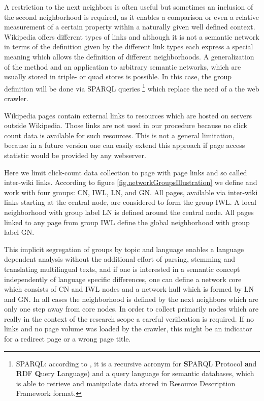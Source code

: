 \documentclass[a4paper,10pt]{scrbook}
\begin{document}
A restriction to the next neighbors is often useful but sometimes an inclusion of the second neighborhood is required, as it enables a comparison or even a relative measurement of a certain property within a naturally given well defined context. Wikipedia offers different types of links and although it is not a semantic network in terms of the definition given by \cite{SOWA1987} the different link types each express a special meaning which allows the definition of different neighborhoods. A generalization of the method and an application to arbitrary semantic networks, which are usually stored in triple- or quad stores is possible. In this case, the group definition will be done via SPARQL queries \footnote{SPARQL: according to \cite{wikipedia.sparql}, it is a recursive acronym for \textbf{S}PARQL \textbf{P}rotocol \textbf{a}nd \textbf{R}DF \textbf{Q}uery \textbf{L}anguage) and a query language for semantic databases, which is able to retrieve and manipulate data stored in Resource Description Framework format.}  which replace the need of a the web crawler. 
   
Wikipedia pages contain external links to resources which are hosted on servers outside Wikipedia. Those links are not used in our procedure because no click count data is available for such resources. This is not a general limitation, because in a future version 
one can easily extend this approach if page access statistic would be provided by any webserver.

Here we limit click-count data collection to page with page links and so called inter-wiki links. According to figure \ref{fig.networkGroupsIllustration}
%
we define and work with four groups: CN, IWL, LN, and GN. All pages, available via inter-wiki links starting at the central node, are considered to form the group IWL. A local neighborhood with group label LN is defined around the central node. All pages linked to any page from group IWL define the global neighborhood with group label GN. 

This implicit segregation of groups by topic and language enables a language dependent analysis without the additional effort of parsing, stemming and translating multilingual texts, and if one is interested in a semantic concept independently of language specific differences, one can define a network core which consists of CN and IWL nodes and a network hull which is formed by LN and GN. In all cases the neighborhood is defined by the next neighbors which are only one step away from core nodes. In order to collect primarily nodes which are really in the context of the research scope a careful verification is required. If no links and no page volume was loaded by the crawler, this might be an indicator for a redirect page or a wrong page title. 
\end{document}
